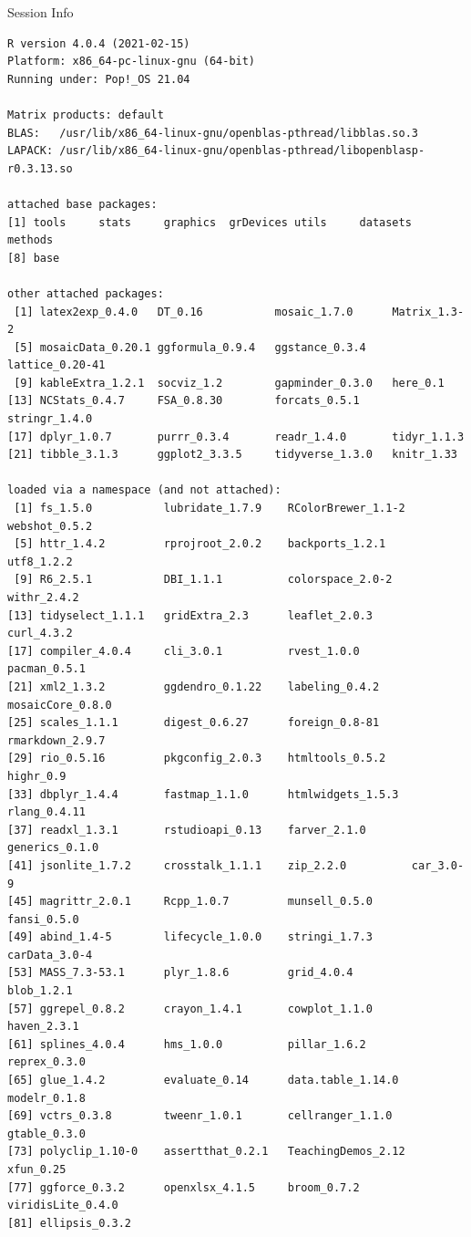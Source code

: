 \documentclass[10pt]{beamer}\usepackage[]{graphicx}\usepackage[]{color}
\makeatletter
\newenvironment{kframe}{%
 \def\at@end@of@kframe{}%
 \ifinner\ifhmode%
  \def\at@end@of@kframe{\end{minipage}}%
  \begin{minipage}{\columnwidth}%
 \fi\fi%
 \def\FrameCommand##1{\hskip\@totalleftmargin \hskip-\fboxsep
 \colorbox{shadecolor}{##1}\hskip-\fboxsep
     \hskip-\linewidth \hskip-\@totalleftmargin \hskip\columnwidth}%
 \MakeFramed {\advance\hsize-\width
   \@totalleftmargin\z@ \linewidth\hsize
   \@setminipage}}%
 {\par\unskip\endMakeFramed%
 \at@end@of@kframe}
\newenvironment{knitrout}{}{} %
\makeatother
\begin{document}
\begin{frame}[fragile]{Session Info}
	\tiny
	
\begin{knitrout}\tiny
{}\color{fgcolor}\begin{kframe}
\begin{verbatim}
R version 4.0.4 (2021-02-15)
Platform: x86_64-pc-linux-gnu (64-bit)
Running under: Pop!_OS 21.04

Matrix products: default
BLAS:   /usr/lib/x86_64-linux-gnu/openblas-pthread/libblas.so.3
LAPACK: /usr/lib/x86_64-linux-gnu/openblas-pthread/libopenblasp-r0.3.13.so

attached base packages:
[1] tools     stats     graphics  grDevices utils     datasets  methods  
[8] base     

other attached packages:
 [1] latex2exp_0.4.0   DT_0.16           mosaic_1.7.0      Matrix_1.3-2     
 [5] mosaicData_0.20.1 ggformula_0.9.4   ggstance_0.3.4    lattice_0.20-41  
 [9] kableExtra_1.2.1  socviz_1.2        gapminder_0.3.0   here_0.1         
[13] NCStats_0.4.7     FSA_0.8.30        forcats_0.5.1     stringr_1.4.0    
[17] dplyr_1.0.7       purrr_0.3.4       readr_1.4.0       tidyr_1.1.3      
[21] tibble_3.1.3      ggplot2_3.3.5     tidyverse_1.3.0   knitr_1.33       

loaded via a namespace (and not attached):
 [1] fs_1.5.0           lubridate_1.7.9    RColorBrewer_1.1-2 webshot_0.5.2     
 [5] httr_1.4.2         rprojroot_2.0.2    backports_1.2.1    utf8_1.2.2        
 [9] R6_2.5.1           DBI_1.1.1          colorspace_2.0-2   withr_2.4.2       
[13] tidyselect_1.1.1   gridExtra_2.3      leaflet_2.0.3      curl_4.3.2        
[17] compiler_4.0.4     cli_3.0.1          rvest_1.0.0        pacman_0.5.1      
[21] xml2_1.3.2         ggdendro_0.1.22    labeling_0.4.2     mosaicCore_0.8.0  
[25] scales_1.1.1       digest_0.6.27      foreign_0.8-81     rmarkdown_2.9.7   
[29] rio_0.5.16         pkgconfig_2.0.3    htmltools_0.5.2    highr_0.9         
[33] dbplyr_1.4.4       fastmap_1.1.0      htmlwidgets_1.5.3  rlang_0.4.11      
[37] readxl_1.3.1       rstudioapi_0.13    farver_2.1.0       generics_0.1.0    
[41] jsonlite_1.7.2     crosstalk_1.1.1    zip_2.2.0          car_3.0-9         
[45] magrittr_2.0.1     Rcpp_1.0.7         munsell_0.5.0      fansi_0.5.0       
[49] abind_1.4-5        lifecycle_1.0.0    stringi_1.7.3      carData_3.0-4     
[53] MASS_7.3-53.1      plyr_1.8.6         grid_4.0.4         blob_1.2.1        
[57] ggrepel_0.8.2      crayon_1.4.1       cowplot_1.1.0      haven_2.3.1       
[61] splines_4.0.4      hms_1.0.0          pillar_1.6.2       reprex_0.3.0      
[65] glue_1.4.2         evaluate_0.14      data.table_1.14.0  modelr_0.1.8      
[69] vctrs_0.3.8        tweenr_1.0.1       cellranger_1.1.0   gtable_0.3.0      
[73] polyclip_1.10-0    assertthat_0.2.1   TeachingDemos_2.12 xfun_0.25         
[77] ggforce_0.3.2      openxlsx_4.1.5     broom_0.7.2        viridisLite_0.4.0 
[81] ellipsis_0.3.2    
\end{verbatim}
\end{kframe}
\end{knitrout}
	
\end{frame}
\end{document}
